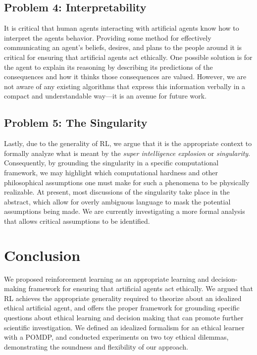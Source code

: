 \documentclass[11pt]{article}
\begin{document}
\subsection{Problem 4: Interpretability} It is critical that human agents interacting with artificial agents know how to interpret the agents behavior. Providing some method for effectively communicating an agent's beliefs, desires, and plans to the people around it is critical for ensuring that artificial agents act ethically. One possible solution is for the agent to explain its reasoning by describing its predictions of the consequences and how it thinks those consequences are valued. However, we are not aware of any existing algorithms that express this information verbally in a compact and understandable way---it is an avenue for future work.

\subsection{Problem 5: The Singularity} Lastly, due to the generality of RL, we argue that it is the appropriate context to formally analyze what is meant by the {\it super intelligence explosion} or {\it singularity}. Consequently, by grounding the singularity in a specific computational framework, we may highlight which computational hardness and other philosophical assumptions one must make for such a phenomena to be physically realizable. At present, most discussions of the singularity take place in the abstract, which allow for overly ambiguous language to mask the potential assumptions being made. We are currently investigating a more formal analysis that allows critical assumptions to be identified.


\section{Conclusion}

We proposed reinforcement learning as an appropriate learning and decision-making framework for ensuring that artificial agents act ethically. We argued that RL achieves the appropriate generality required to theorize about an idealized ethical artificial agent, and offers the proper framework for grounding specific questions about ethical learning and decision making that can promote further scientific investigation. We defined an idealized formalism for an ethical learner with a POMDP, and conducted experiments on two toy ethical dilemmas, demonstrating the soundness and flexibility of our approach.
\end{document}
